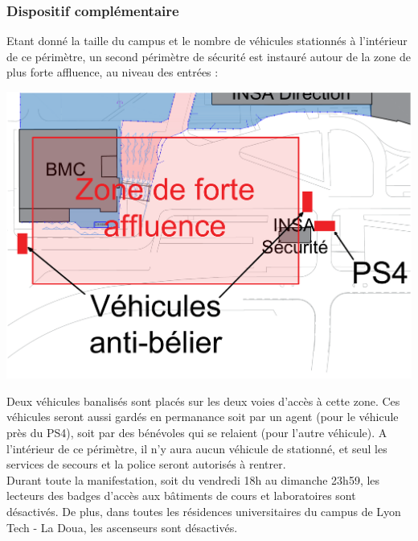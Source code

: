 \documentclass[hidelinks, paper=a4, fontsize=13pt]{report}
\begin{document}
\subsubsection{Dispositif complémentaire}
\label{perimetre}

Etant donné la taille du campus et le nombre de véhicules stationnés à l'intérieur de ce périmètre, un second périmètre de sécurité est instauré autour de la zone de plus forte affluence, au niveau des entrées :

\begin{center}
	\includegraphics[width=.8\textwidth,keepaspectratio]{Exports/Plan_24h_45eme-Vehicules_beliers}
\end{center}

Deux véhicules banalisés sont placés sur les deux voies d'accès à cette zone. Ces véhicules seront aussi gardés en permanance soit par un agent (pour le véhicule près du PS4), soit par des bénévoles qui se relaient (pour l'autre véhicule). A l'intérieur de ce périmètre, il n'y aura aucun véhicule de stationné, et seul les services de secours et la police seront autorisés à rentrer.
\\
Durant toute la manifestation, soit du vendredi 18h au dimanche 23h59, les lecteurs des badges d’accès aux bâtiments de cours et laboratoires sont désactivés. De plus, dans toutes les résidences universitaires du campus de Lyon Tech - La Doua, les ascenseurs sont désactivés.\\

\newpage
\end{document}

